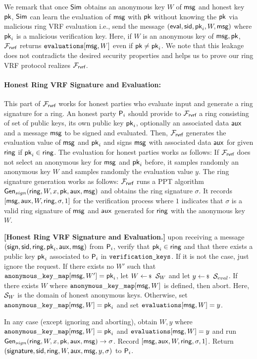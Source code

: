 We remark that once $ \mathsf{Sim} $ obtains an anonymous key $ W $ of  $ \mathsf{msg} $  and honest key $ \mathsf{pk} $,  $ \mathsf{Sim} $ can learn the  evaluation of  $ \mathsf{msg} $ with $ \mathsf{pk} $ without knowing the $ \mathsf{pk} $ via malicious ring VRF evaluation i.e., send the message $ (\mathsf{eval}, \textsf{sid}, \mathsf{pk}_i,W,\mathsf{msg}) $ where $ \mathsf{pk}_i $ is a malicious verification key. Here, if $ W $ is an anonymous key of $ \mathsf{msg}, \mathsf{pk}  $, $ \mathcal{F}_{\textsf{rvrf}} $ returns $ \texttt{evaluations}[\mathsf{msg}, W] $ even if $ \mathsf{pk} \neq \mathsf{pk}_i $. We note that this leakage does not contradicts the desired security properties and helps us to prove our ring VRF protocol realizes $ \mathcal{F}_{\textsf{rvrf}} $.  


\paragraph{Honest Ring VRF Signature and Evaluation:} This part of $ \mathcal{F}_{\textsf{rvrf}} $ works for honest parties who evaluate  input and generate a ring signature for a ring. An honest party $ \mathsf{P}_i $ should provide to $ \mathcal{F}_{\textsf{rvrf}} $ a ring consisting of set of public keys, its own public key $ \mathsf{pk}_i $, optionally an associated data $ \mathsf{aux} $ and a message $ \mathsf{msg} $ to be signed and evaluated. Then, $ \mathcal{F}_{\textsf{rvrf}} $ generates the evaluation value of $ \mathsf{msg} $ and $ \mathsf{pk}_i $ and signs $ \mathsf{msg} $ with associated data $ \mathsf{aux} $ for given $ \mathsf{ring} $ if $ \mathsf{pk}_i \in \mathsf{ring} $. The evaluation for honest parties works as follows: If $ \mathcal{F}_{\textsf{rvrf}} $ does not select an anonymous key for $ \mathsf{msg} $ and $ \mathsf{pk}_i $ before, it samples randomly an anonymous key $ W $ and samples randomly the evaluation value $ y $. The ring signature generation works as follows:  $ \mathcal{F}_{\textsf{rvrf}} $ runs a PPT algorithm $ \mathsf{Gen}_{sign}(\mathsf{ring}, W, x,\mathsf{pk},\mathsf{aux},\mathsf{msg}) $ and obtains the ring signature $ \sigma $. It records $  [\mathsf{msg},\mathsf{aux}, W, \mathsf{ring},\sigma, 1]  $ for the verification process where $ 1 $ indicates that $ \sigma  $ is a valid ring signature of $ \mathsf{msg} $ and $ \mathsf{aux} $ generated for $ \mathsf{ring} $ with the anonymous key $ W $.

\begin{tcolorbox}[left=2pt,right=2pt]
	\textbf{[Honest Ring VRF Signature and Evaluation.]} upon receiving a message $(\mathsf{sign}, \textsf{sid}, \mathsf{ring}, \mathsf{pk}_i,\mathsf{aux}, \mathsf{msg})$ from $\mathsf{P}_i$, verify that $\mathsf{pk}_i \in \mathsf{ring}$ and that there exists a public key $\mathsf{pk}_i$ associated to $\mathsf{P}_i$ in $ \texttt{verification\_keys} $. If it is not the case, just ignore the request. 	
	If there exists no $ W' $ such that $ \mathtt{anonymous\_key\_map}[\mathsf{msg},W'] =  \mathsf{pk}_i $, let $ W \leftsample \setsym{S}_W $ and let $y \leftsample \setsym{S}_{eval}$. If there exists $ W $ where $ \mathtt{anonymous\_key\_map}[\mathsf{msg},W] $ is defined, then abort. Here, $ {\mathcal{S}}_W $ is the domain of honest anonymous keys. Otherwise, set $ \mathtt{anonymous\_key\_map}[\mathsf{msg},W] = \mathsf{pk}_i $ and set $ \texttt{evaluations}[\mathsf{msg}, W] = y$.
	
	In any case (except ignoring and aborting), obtain $ W, y $ where $ \mathtt{anonymous\_key\_map}[\mathsf{msg},W] =\mathsf{pk}_i $ and $ \texttt{evaluations}[\mathsf{msg}, W] = y$  and run  $ \mathsf{Gen}_{sign}(\mathsf{ring}, W,x,\mathsf{pk},\mathsf{aux},\mathsf{msg}) \rightarrow \sigma $. 
	Record $ [\mathsf{msg},\mathsf{aux}, W, \mathsf{ring},\sigma, 1] $. Return $(\mathsf{signature}, \textsf{sid}, \mathsf{ring},W,\mathsf{aux},\mathsf{msg}, y, \sigma )$ to $\mathsf{P}_i$.
\end{tcolorbox}


